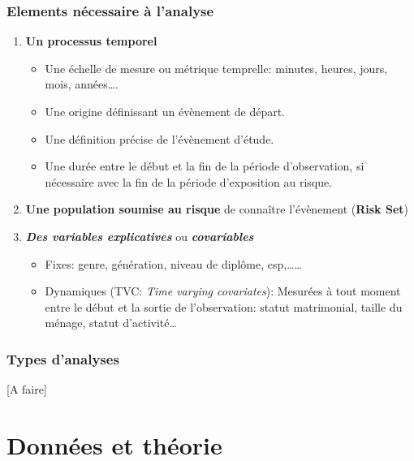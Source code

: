\documentclass[
  12pt,
  letterpaper,
  DIV=11,
  numbers=noendperiod,
  onepage,
  openany]{scrreprt}
\providecommand{\tightlist}{%
  \setlength{\itemsep}{0pt}\setlength{\parskip}{0pt}}\usepackage{longtable,booktabs,array}
\begin{document}
\hypertarget{elements-nuxe9cessaire-uxe0-lanalyse}{%
\section{Elements nécessaire à
l'analyse}\label{elements-nuxe9cessaire-uxe0-lanalyse}}

\begin{enumerate}
\def\labelenumi{\arabic{enumi}.}
\item
  \textbf{Un processus temporel}

  \begin{itemize}
  \tightlist
  \item
    Une échelle de mesure ou métrique temprelle: minutes, heures, jours,
    mois, années\ldots.
  \item
    Une origine définissant un évènement de départ.\\
  \item
    Une définition précise de l'évènement d'étude.\\
  \item
    Une durée entre le début et la fin de la période d'observation, si
    nécessaire avec la fin de la période d'exposition au risque.
  \end{itemize}
\item
  \textbf{Une population soumise au risque} de connaître l'évènement
  (\textbf{Risk Set})
\item
  \textbf{\emph{Des variables explicatives}} ou
  \textbf{\emph{covariables}}

  \begin{itemize}
  \tightlist
  \item
    Fixes: genre, génération, niveau de diplôme, csp,\ldots\ldots{}
  \item
    Dynamiques (TVC: \emph{Time varying covariates}): Mesurées à tout
    moment entre le début et la sortie de l'observation: statut
    matrimonial, taille du ménage, statut d'activité\ldots{}
  \end{itemize}
\end{enumerate}

\hypertarget{types-danalyses}{%
\section{Types d'analyses}\label{types-danalyses}}

{[}A faire{]}

\part{Données et théorie}
\end{document}
